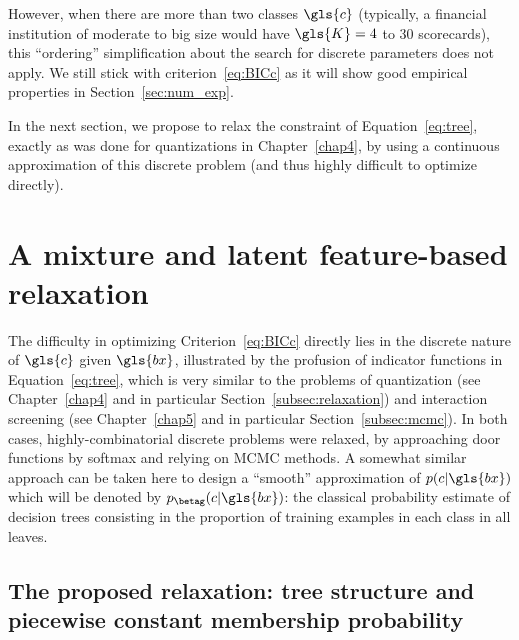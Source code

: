 However, when there are more than two classes $\gls{c}$ (typically, a financial institution of moderate to big size would have $\gls{K} = 4$ to $30$ scorecards), this ``ordering'' simplification about the search for discrete parameters does not apply. We still stick with criterion~\eqref{eq:BICc} as it will show good empirical properties in Section~\ref{sec:num_exp}.


In the next section, we propose to relax the constraint of Equation~\eqref{eq:tree}, exactly as was done for quantizations in Chapter~\ref{chap4}, by using a continuous approximation of this discrete problem (and thus highly difficult to optimize directly).


\section{A mixture and latent feature-based relaxation}

The difficulty in optimizing Criterion~\eqref{eq:BICc} directly lies in the discrete nature of $\gls{c}$ given $\gls{bx}$, illustrated by the profusion of indicator functions in Equation~\eqref{eq:tree}, which is very similar to the problems of quantization (see Chapter~\ref{chap4} and in particular Section~\ref{subsec:relaxation}) and interaction screening (see Chapter~\ref{chap5} and in particular Section~\ref{subsec:mcmc}). In both cases, highly-combinatorial discrete problems were relaxed, by approaching door functions by softmax and relying on MCMC methods. A somewhat similar approach can be taken here to design a ``smooth'' approximation of $p(c | \gls{bx})$ which will be denoted by $p_{\betag}(c | \gls{bx})$: the classical probability estimate of decision trees consisting in the proportion of training examples in each class in all leaves.

\subsection{The proposed relaxation: tree structure and piecewise constant membership probability} \label{subsec:relax_tree}

